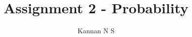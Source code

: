 \documentclass[journal,12pt,twocolumn]{IEEEtran}
\begin{document}
\makeatletter
{}
\makeatother

\let\StandardTheFigure\thefigure
\let\vec\mathbf
\let\j\jmath
\renewcommand{\thefigure}{\theproblem}



\def\putbox#1#2#3{\makebox[0in][l]{\makebox[#1][l]{}\raisebox{\baselineskip}[0in][0in]{\raisebox{#2}[0in][0in]{#3}}}}
     \def\rightbox#1{\makebox[0in][r]{#1}}
     \def\centbox#1{\makebox[0in]{#1}}
     \def\topbox#1{\raisebox{-\baselineskip}[0in][0in]{#1}}
     \def\midbox#1{\raisebox{-0.5\baselineskip}[0in][0in]{#1}}

\vspace{3cm}

\title{
	Assignment 2 - Probability
}


%
%
%

\author{
	Kannan N S
}
% 
%
\end{document}
